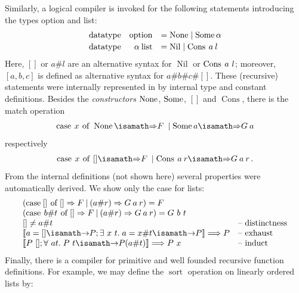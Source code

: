 Similarly, a logical compiler is invoked for the following statements 
introducing the types option and list:
\begin{gather}
  \begin{array}{lrll}
    {\operatorname{datatype}} & \mathrm{option}       &= \operatorname{None} \mid \operatorname{Some}{\alpha}\\[.5ex]
    {\operatorname{datatype}} & \alpha\:\mathrm{list} &= \operatorname{Nil} \mid
    \operatorname{Cons}\: a\: l
  \end{array}
\end{gather}
Here, $[]$ or $a\#l$ are an alternative syntax for $\operatorname{Nil}$
or $\operatorname{Cons}\: a ~l$; moreover, $[a, b, c]$ is defined as
alternative syntax for $a\#b\#c\#[]$. These (recursive) statements
were internally represented in by internal type and constant
definitions. Besides the \emph{constructors} $\operatorname{None}$, $\operatorname{Some}$,
$[]$ and $\operatorname{Cons}$, there is the match operation
\begin{gather}
\HolCase\ap x\ap\HolOf~\HolNone \isasymRightarrow F\ap \mid
\HolSome{a} \isasymRightarrow G\ap a
\end{gather}
respectively
\begin{gather}
\HolCase\ap x\ap\HolOf~[] \isasymRightarrow F\ap \mid \operatorname{Cons}\ap a\ap
r \isasymRightarrow G\ap a\ap r\mi{.}
\end{gather}
From the internal definitions (not shown here) several properties were
automatically derived. We show only the case for lists:
\begin{gather}\label{eq:datatype-rules}
  \begin{array}{ll}
    (\HolCase\ap[]\ap\HolOf\ap[] \Rightarrow F  \ap | \ap  (a\#r) \Rightarrow
    G\ap a\ap r) = F &\\
    (\HolCase \ap  b\#t  \ap \HolOf  \ap [] \Rightarrow F  \ap  | \ap
    (a\#r) \Rightarrow G\ap a\ap r) = G~b~t &\\ %
    \mbox{}[] \neq a\#t    &\text{-- distinctness} \\
    \semantics{a = [] \implies P ; \exists~x~t\spot  a = x\#t \implies P } \Longrightarrow P &\text{-- exhaust} \\
    \semantics{P~[] ; \forall~at\spot  P~t \implies P (a\#t) } \Longrightarrow P~x      &\text{-- induct}
  \end{array}
\end{gather}
Finally, there is a compiler for primitive and well founded recursive
function definitions. For example, we may define the
$\operatorname{sort}$ operation on linearly ordered lists by:
